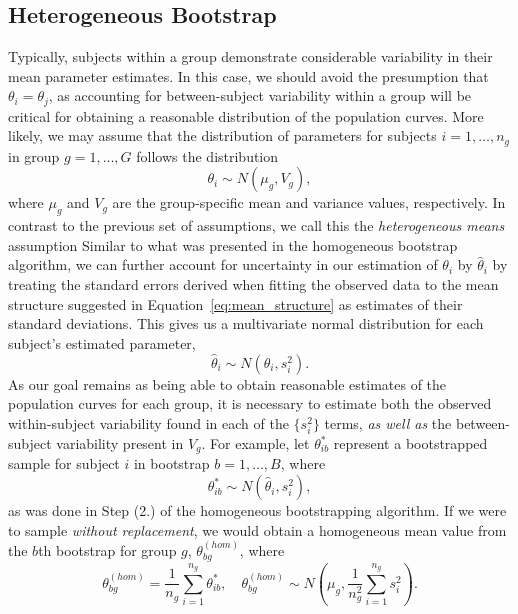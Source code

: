\documentclass{article}
\begin{document}
\subsection{Heterogeneous Bootstrap}

Typically, subjects within a group demonstrate considerable variability in their mean parameter estimates. In this case, we should avoid the presumption that $\theta_i = \theta_j$, as accounting for between-subject variability within a group will be critical for obtaining a reasonable distribution of the population curves. More likely, we may assume that the distribution of parameters for subjects $i = 1, \dots, n_g$ in group $g = 1, \dots, G$ follows the distribution
\begin{equation}\label{eq:theta_i_dist}
\theta_i \sim N(\mu_{g}, V_{g}),
\end{equation}
where $\mu_g$ and $V_g$ are the group-specific mean and variance values, respectively. In contrast to the previous set of assumptions, we call this the \emph{heterogeneous means} assumption Similar to what was presented in the homogeneous bootstrap algorithm, we can further account for uncertainty in our estimation of $\theta_i$ by $\hat{\theta}_i$ by treating the standard errors derived when fitting the observed data to the mean structure suggested in Equation~\ref{eq:mean_structure} as estimates of their standard deviations. This gives us a multivariate normal distribution for each subject's estimated parameter, 
\begin{equation}
\hat{\theta}_i \sim N(\theta_i, s_i^2).
\end{equation}
As our goal remains as being able to obtain reasonable estimates of the population curves for each group, it is necessary to estimate both the observed within-subject variability found in each of the $\{s_i^2\}$ terms, \textit{as well as} the between-subject variability present in $V_{g}$. For example, let $\theta^*_{ib}$ represent a bootstrapped sample for subject $i$ in bootstrap $b = 1, \dots, B$, where
\begin{equation}\label{eq:sub_boot_dist}
\theta^*_{ib} \sim N(\hat{\theta}_i, s_i^2),
\end{equation}
as was done in Step (2.) of the homogeneous bootstrapping algorithm. If we were to sample \textit{without replacement}, we would obtain a homogeneous mean value from the $b$th bootstrap for group $g$, $\theta^{(hom)}_{bg}$, where
\begin{equation}\label{eq:wo_rep_boot}
\theta^{(hom)}_{bg} = \frac{1}{n_g} \sum_{i=1}^{n_g} \theta^{*}_{ib}, \quad \theta^{(hom)}_{bg} \sim N \left( \mu_{g}, \frac{1}{n_g^2} \sum_{i=1}^{n_g} s_i^2 \right).
\end{equation}
\end{document}
